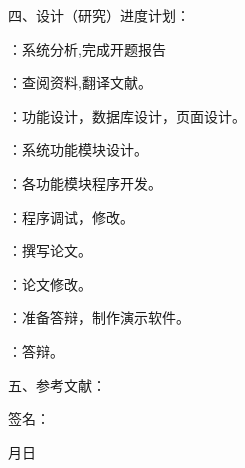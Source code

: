 \documentclass{csustThesis}
\begin{document}
\begin{ubox}
\noindent 四、设计（研究）进度计划：

\settowidth{\maxwidth}{第 12-14 周}
：系统分析,完成开题报告

：查阅资料,翻译文献。

：功能设计，数据库设计，页面设计。

：系统功能模块设计。

：各功能模块程序开发。

：程序调试，修改。

：撰写论文。	

：论文修改。

：准备答辩，制作演示软件。

：答辩。

\end{ubox}

\vspace{-.4\baselineskip}

\begin{ubox}[breakable]
\noindent 五、参考文献：

\vspace*{14\baselineskip}

\printbibliography[heading=none]

\end{ubox}

\vspace{-.4\baselineskip}

\begin{ubox}
\begin{center}

	\vspace{6\baselineskip}  %

	\hspace{3cm}
	签名：\underline{\makebox[3cm][c]{}}
\end{center}

\begin{flushright}
	月\hspace{1cm}日\makebox[1.5cm]{}
\end{flushright}

\end{ubox}
\end{document}
